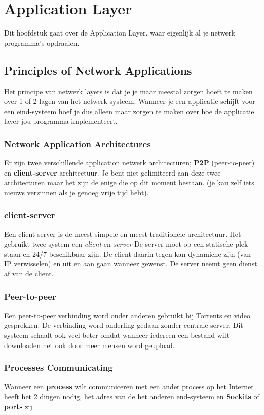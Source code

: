 \section{Application Layer}
Dit hoofdstuk gaat over de Application Layer. waar eigenlijk al je netwerk programma's opdraaien.
\subsection{Principles of Network Applications}
Het principe van netwerk layers is dat je je maar meestal zorgen hoeft te maken over 1 of 2 lagen van het netwerk systeem. Wanneer je een applicatie schijft voor een eind-systeem hoef je dus alleen maar zorgen te maken over hoe de applicatie layer jou programma implementeert.

\subsubsection{Network Application Architectures}
Er zijn twee verschillende application netwerk architecturen; \textbf{P2P} (peer-to-peer) en \textbf{client-server} architectuur. Je bent niet gelimiteerd aan deze twee architecturen maar het zijn de enige die op dit moment bestaan. (je kan zelf iets nieuws verzinnen als je genoeg vrije tijd hebt).

\subsubsection*{client-server}
Een client-server is de meest simpele en meest traditionele architectuur. Het gebruikt twee system een \textit{client} en \textit{server} De server moet op een statische plek staan en 24/7 beschikbaar zijn. De client daarin tegen kan dynamiche zijn (van IP verwisselen) en uit en aan gaan wanneer gewenst. De server neemt geen dienst af van de client.
\subsubsection*{Peer-to-peer}
Een peer-to-peer verbinding word onder anderen gebruikt bij Torrents en video gesprekken. De verbinding word onderling gedaan zonder centrale server. Dit systeem schaalt ook veel beter omdat wanneer iedereen een bestand wilt downloaden het ook door meer mensen word geupload.

\subsubsection{Processes Communicating}
Wanneer een \textbf{process} wilt communiceren met een ander process op het Internet heeft het 2 dingen nodig, het adres van de het anderen end-systeem en 
\textbf{Sockits} of \textbf{ports} zij



